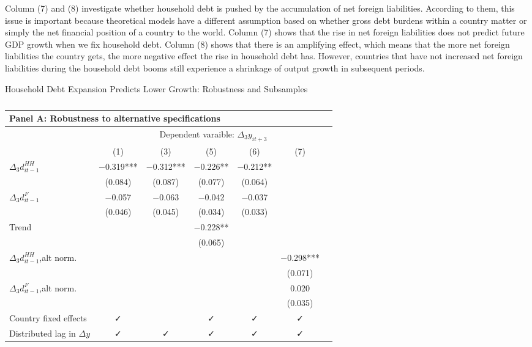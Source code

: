 \documentclass{ltjarticle}
\begin{document}
Column (7) and (8) investigate whether household debt is pushed by the accumulation of net foreign liabilities. According to them, this issue is important because theoretical models have a different assumption based on whether gross debt burdens within a country matter or simply the net financial position of a country to the world. Column (7) shows that the rise in net foreign liabilities does not predict future GDP growth when we fix household debt. Column (8) shows that there is an amplifying effect, which means that the more net foreign liabilities the country gets, the more negative effect the rise in household debt has. However, countries that have not increased net foreign liabilities during the household debt booms still experience a shrinkage of output growth in subsequent periods.

\begin{table}
\small
\begin{center}
\caption{}{Household Debt Expansion Predicts Lower Growth: Robustness and Subsamples}
\label{table4}
\begin{tabular}[h]{lcccccc}
\toprule
\multicolumn{7}{l}{Panel A: Robustness to alternative specifications}\\
\hline
 & \multicolumn{6}{c}{Dependent varaible: $\Delta_{3}y_{it+3}$}\\
\cline{2-7}
  & (1) & (3) & (5) & (6) & (7) &\\
\midrule
$\Delta_{3}d_{it-1}^{HH} $ & \num{-0.319}*** & \num{-0.312}*** & \num{-0.226}** & \num{-0.212}** & \\
 & (\num{0.084}) & (\num{0.087}) & (\num{0.077}) & (\num{0.064}) &  &\\
$\Delta_{3}d_{it-1}^{F} $ & \num{-0.057} & \num{-0.063} & \num{-0.042} & \num{-0.037} & \\
 & (\num{0.046}) & (\num{0.045}) & (\num{0.034}) & (\num{0.033}) &  &\\
Trend &  &  & \num{-0.228}** &  &  &\\
 &  &  & (\num{0.065}) &  &  &\\
$\Delta_{3}d_{it-1}^{HH} $,alt norm. &  &  &  &  & \num{-0.298}*** &\\
 &  &  &  &  & (\num{0.071})\\
$\Delta_{3}d_{it-1}^{F} $,alt norm. &  &  &  &  & \num{0.020} &\\
 &  &  &  &  & (\num{0.035}) &\\
\midrule
Country fixed effects & ✓ &  & ✓ & ✓ & ✓ &\\
Distributed lag in $\Delta{y}$ & ✓ & ✓ & ✓ & ✓ & ✓ &\\

\end{tabular}
\end{center}
\end{table}
\end{document}

